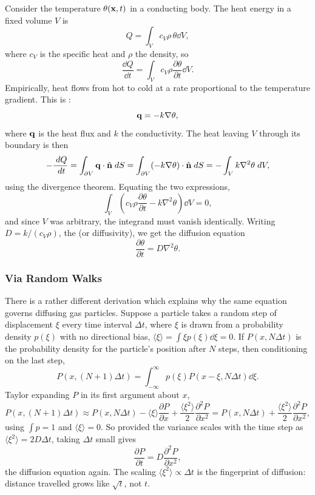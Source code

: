 \documentclass[a4paper]{scrartcl}
\begin{document}
Consider the temperature $\theta(\mathbf{x}, t)$ in a conducting body. The heat energy in a fixed volume $V$ is
$$
Q = \int_V c_V \rho \, \theta \dd V,
$$
where $c_V$ is the specific heat and $\rho$ the density, so
$$
\frac{\dd Q}{\dd t} = \int_V c_V \rho \frac{\partial \theta}{\partial t} \dd V.
$$
Empirically, heat flows from hot to cold at a rate proportional to the temperature gradient. This is :
$$
\mathbf{q} = -k \nabla \theta,
$$
where $\mathbf{q}$ is the heat flux and $k$ the conductivity. The heat leaving $V$ through its boundary is then
$$
-\frac{\; d Q}{\; d t} = \int_{\partial V} \mathbf{q} \cdot \hat{\mathbf{n}} \; d S = \int_{\partial V} (-k \nabla \theta) \cdot \hat{\mathbf{n}} \; d S = -\int_V k \nabla^2 \theta \; d V,
$$
using the divergence theorem. Equating the two expressions,
$$
\int_V \left(c_V \rho \frac{\partial \theta}{\partial t} - k \nabla^2 \theta \right) \dd V = 0,
$$
and since $V$ was arbitrary, the integrand must vanish identically. Writing $D = k /(c_V \rho)$, the  (or diffusivity), we get the diffusion equation
$$
\frac{\partial \theta}{\partial t} = D \nabla^2 \theta.
$$

\subsubsection*{Via Random Walks}

There is a rather different derivation which explains why the same equation governs diffusing gas particles. Suppose a particle takes a random step of displacement $\xi$ every time interval $\Delta t$, where $\xi$ is drawn from a probability density $p(\xi)$ with no directional bias, $\langle \xi \rangle = \int \xi p(\xi) \dd \xi = 0$.
If $P(x, N \Delta t)$ is the probability density for the particle's position after $N$ steps, then conditioning on the last step,
$$
P(x, (N + 1)\Delta t) = \int_{-\infty}^{\infty} p(\xi) P(x - \xi, N \Delta t) \dd \xi.
$$
Taylor expanding $P$ in its first argument about $x$,
$$
P(x, (N+1)\Delta t) \approx P(x, N \Delta t) - \langle \xi \rangle \frac{\partial P}{\partial x} + \frac{\langle \xi^2 \rangle}{2} \frac{\partial^2 P}{\partial x^2} = P(x, N \Delta t) + \frac{\langle \xi^2 \rangle}{2} \frac{\partial^2 P}{\partial x^2},
$$
using $\int p = 1$ and $\langle \xi \rangle = 0$. So provided the variance scales with the time step as $\langle \xi^2 \rangle = 2 D \Delta t$, taking $\Delta t$ small gives
$$
\frac{\partial P}{\partial t} = D \frac{\partial^2 P}{\partial x^2},
$$
the diffusion equation again. The scaling $\langle \xi^2 \rangle \propto \Delta t$ is the fingerprint of diffusion: distance travelled grows like $\sqrt{t}$, not $t$.
\end{document}
